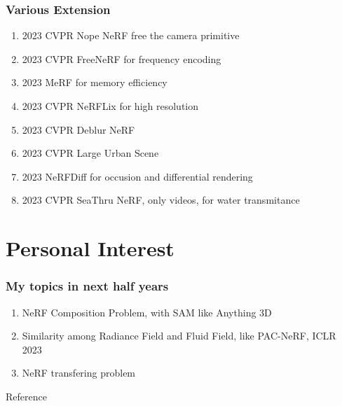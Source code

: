 \documentclass[10pt, hyperref={colorlinks=true,linkcolor=blue},xcolor=dvipsnames]{beamer}
\begin{document}
\begin{frame}
    \frametitle{Various Extension}
    \begin{enumerate}
        \item 2023 CVPR Nope NeRF \cite{bianNoPeNeRFOptimisingNeural2023} free the camera primitive
        \item 2023 CVPR FreeNeRF \cite{yangFreeNeRFImprovingFewshot2023} for frequency encoding
        \item 2023 MeRF\cite{reiserMERFMemoryEfficientRadiance2023} for memory efficiency
        \item 2023 CVPR NeRFLix \cite{zhouNeRFLiXHighQualityNeural2023} for high resolution
        \item 2023 CVPR Deblur NeRF \cite{leeDPNeRFDeblurredNeural2023}
        \item 2023 CVPR Large Urban Scene \cite{xuGridguidedNeuralRadiance2023}
        \item 2023 NeRFDiff \cite{guNerfDiffSingleimageView2023} for occusion and differential rendering
        \item 2023 CVPR SeaThru NeRF, only videos, for water transmitance
    \end{enumerate}
\end{frame}

\section{Personal Interest}

\begin{frame}
    \frametitle{My topics in next half years}
    \begin{enumerate}
        \item NeRF Composition Problem, with SAM\cite{kirillovSegmentAnything2023} like Anything 3D\cite{shenAnything3DSingleviewAnything2023}
        \item Similarity among Radiance Field and Fluid Field, like PAC-NeRF\cite{liPACNeRFPhysicsAugmented2023}, ICLR 2023
        \item NeRF transfering problem
    \end{enumerate}
\end{frame}

\begin{frame}[allowframebreaks]{Reference}
    
    
\end{frame}
\end{document}
